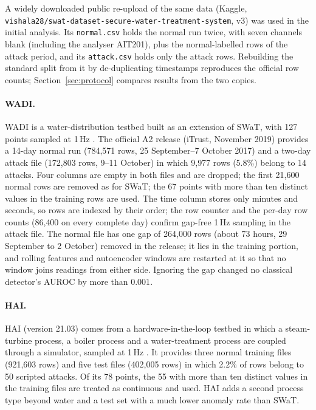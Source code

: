 \documentclass[11pt]{article}
\begin{document}
A widely downloaded public re-upload of the same data (Kaggle,
\texttt{vishala28/swat-dataset-secure-water-treatment-system}, v3) was used in the
initial analysis. Its \texttt{normal.csv} holds the normal run twice, with seven
channels blank (including the analyser AIT201), plus the normal-labelled rows of the
attack period, and its \texttt{attack.csv} holds only the attack rows. Rebuilding the
standard split from it by de-duplicating timestamps reproduces the official row counts;
Section~\ref{sec:protocol} compares results from the two copies.

\paragraph{WADI.} WADI is a water-distribution testbed built as an extension of SWaT,
with 127 points sampled at 1\,Hz \citep{ahmed2017}. The official A2 release (iTrust,
November 2019) provides a 14-day normal run (784{,}571 rows, 25 September--7 October
2017) and a two-day attack file (172{,}803 rows, 9--11 October) in which 9{,}977 rows
(5.8\%) belong to 14 attacks. Four columns are empty in both files and are dropped; the
first 21{,}600 normal rows are removed as for SWaT; the 67 points with more than ten
distinct values in the training rows are used. The time column stores only minutes and
seconds, so rows are indexed by their order; the row counter and the per-day row counts
(86{,}400 on every complete day) confirm gap-free 1\,Hz sampling in the attack file. The
normal file has one gap of 264{,}000 rows (about 73 hours, 29 September to 2 October)
removed in the release; it lies in the training portion, and rolling features and
autoencoder windows are restarted at it so that no window joins readings from either side.
Ignoring the gap changed no classical detector's AUROC by more than $0.001$.

\paragraph{HAI.} HAI (version 21.03) comes from a hardware-in-the-loop testbed in
which a steam-turbine process, a boiler process and a water-treatment process are
coupled through a simulator, sampled at 1\,Hz \citep{shin2020,shin2021}. It provides
three normal training files (921{,}603 rows) and five test files (402{,}005 rows) in
which 2.2\% of rows belong to 50 scripted attacks. Of its 78 points, the 55 with more
than ten distinct values in the training files are treated as continuous and used.
HAI adds a second process type beyond water and a test set with a much lower
anomaly rate than SWaT.
\end{document}
